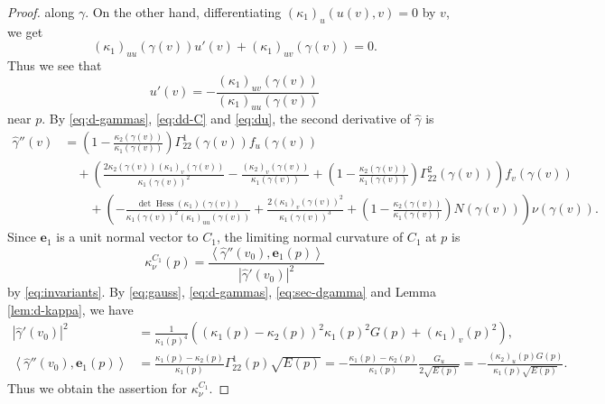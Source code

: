 \documentclass[11pt,a4paper,pdflatex,final]{amsart}
\theoremstyle{plain}
\theoremstyle{definition}
\theoremstyle{remark}
\newcommand{\hess}{\operatorname{Hess}}
\newcommand{\0}{\bm{0}}
\newcommand{\be}{\bm{e}}
\newcommand{\inner}[2]{\left\langle{#1},{#2}\right\rangle}
\numberwithin{equation}{section}
\begin{document}
{\begin{proof}
	along $\gamma$. 
	On the other hand, differentiating $(\kappa_1)_{u}(u(v),v)=0$ by $v$, 
	we get 
	\[
	(\kappa_1)_{uu}(\gamma(v))u'(v)+(\kappa_1)_{uv}(\gamma(v))=0.	
	\]
	Thus we see that 
	\begin{equation}\label{eq:du}
		u'(v)=-\frac{(\kappa_1)_{uv}(\gamma(v))}{(\kappa_1)_{uu}(\gamma(v))}
	\end{equation}
	near $p$. 
	By \eqref{eq:d-gammas}, \eqref{eq:dd-C} and \eqref{eq:du}, 
	the second derivative of $\hat{\gamma}$ is 
	\begin{equation}\label{eq:sec-dgamma}
		\begin{aligned}
			\hat{\gamma}''(v)
			&=\left(1-\frac{\kappa_2(\gamma(v))}{\kappa_1(\gamma(v))}\right)
			\Gamma^{1}_{22}(\gamma(v))f_u(\gamma(v))\\
			&\quad+\left(\frac{2\kappa_2(\gamma(v))(\kappa_1)_v(\gamma(v))}{\kappa_1(\gamma(v))^2}
			-\frac{(\kappa_2)_{v}(\gamma(v))}{\kappa_1(\gamma(v))}
			+\left(1-\frac{\kappa_2(\gamma(v))}{\kappa_1(\gamma(v))}\right)\Gamma^{2}_{22}(\gamma(v))\right)
			f_v(\gamma(v))\\
			&\quad\quad+\left(-\frac{\det\hess(\kappa_1)(\gamma(v))}{\kappa_1(\gamma(v))^2(\kappa_1)_{uu}(\gamma(v))}
			+\frac{2(\kappa_1)_v(\gamma(v))^2}{\kappa_1(\gamma(v))^3}
			+\left(1-\frac{\kappa_2(\gamma(v))}{\kappa_1(\gamma(v))}\right)N(\gamma(v))	
			\right)\nu(\gamma(v)).
		\end{aligned}
	\end{equation}
	Since $\be_1$ is a unit normal vector to $C_1$, 
	the limiting normal curvature of $C_1$ at $p$ is 
	\[
	\kappa_\nu^{C_1}(p)=\frac{\inner{\hat{\gamma}''(v_0)}{\be_1(p)}}{|\hat{\gamma}'(v_0)|^2}
	\]
	by \eqref{eq:invariants}. 
	By \eqref{eq:gauss}, \eqref{eq:d-gammas}, \eqref{eq:sec-dgamma} 
	and Lemma \ref{lem:d-kappa}, we have 
	\[
	\begin{aligned}
		|\hat{\gamma}'(v_0)|^2&
		=\frac{1}{\kappa_1(p)^4}
		\left((\kappa_1(p)-\kappa_2(p))^2\kappa_1(p)^2G(p)+(\kappa_1)_v(p)^2\right),\\
		\inner{\hat{\gamma}''(v_0)}{\be_1(p)}&=
		\frac{\kappa_1(p)-\kappa_2(p)}{\kappa_1(p)}\Gamma^{1}_{22}(p)\sqrt{E(p)}
		=-\frac{\kappa_1(p)-\kappa_2(p)}{\kappa_1(p)}\frac{G_u}{2\sqrt{E(p)}}
		=-\frac{(\kappa_2)_u(p)G(p)}{\kappa_1(p)\sqrt{E(p)}}.
	\end{aligned}
	\]
	Thus we obtain the assertion for $\kappa_\nu^{C_1}$. 
	

\end{proof}}
\end{document}

